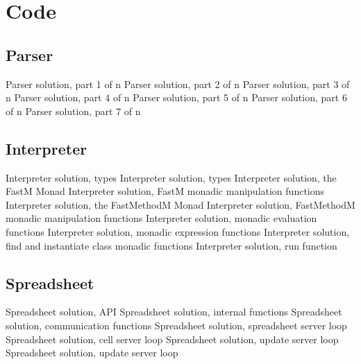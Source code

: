 %
%

\section{Code}
\subsection{Parser}
\label{appendix:parser}
{Parser solution, part 1 of n}
{Parser solution, part 2 of n}
{Parser solution, part 3 of n}
{Parser solution, part 4 of n}
{Parser solution, part 5 of n}
{Parser solution, part 6 of n}
{Parser solution, part 7 of n}

\subsection{Interpreter}
\label{appendix:interpreter}
{Interpreter solution, types}
{Interpreter solution, types}
{Interpreter solution, the FastM Monad}
{Interpreter solution, FastM monadic manipulation functions}
{Interpreter solution, the FastMethodM Monad}
{Interpreter solution, FastMethodM monadic manipulation functions}
{Interpreter solution, monadic evaluation functions}
{Interpreter solution, monadic expression functions}
{Interpreter solution, find and instantiate class monadic functions}
{Interpreter solution, run function}

\subsection{Spreadsheet}
\label{appendix:spreadsheet}
{Spreadsheet solution, API}
{Spreadsheet solution, internal functions}
{Spreadsheet solution, communication functions}
{Spreadsheet solution, spreadsheet server loop}
{Spreadsheet solution, cell server loop}
{Spreadsheet solution, update server loop}
{Spreadsheet solution, update server loop}
